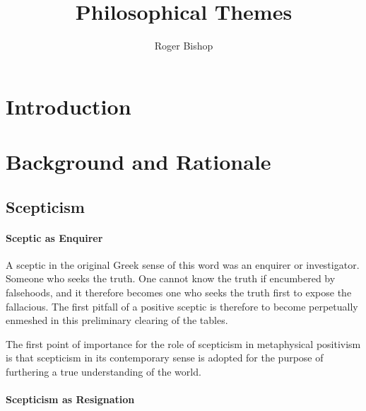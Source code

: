 \documentclass{rbjk}
\begin{document}
                                                                                   
\begin{article}
\begin{opening}  
\title{Philosophical Themes}
\author{Roger Bishop }

\begin{abstract}

\end{abstract}
\end{opening}

\setcounter{tocdepth}{4}
{\parskip-0pt\tableofcontents}

\section{Introduction}


\section{Background and Rationale}


\subsection{Scepticism}



\paragraph{Sceptic as Enquirer}

A sceptic in the original Greek sense of this word was an enquirer or investigator.
Someone who seeks the truth.
One cannot know the truth if encumbered by falsehoods, and it therefore becomes one who seeks the truth first to expose the fallacious.
The first pitfall of a positive sceptic is therefore to become perpetually enmeshed in this preliminary clearing of the tables.

The first point of importance for the role of scepticism in metaphysical positivism is that scepticism in its contemporary sense is adopted for the purpose of furthering a true understanding of the world.

\paragraph{Scepticism as Resignation}


\end{article}
\end{document}
